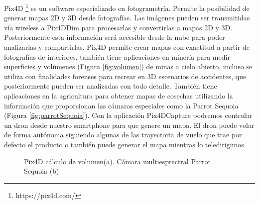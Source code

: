 \begin {enumerate}
Pix4D \footnote{https://pix4d.com/} es un software especializado en fotogrametría. Permite la posibilidad de generar mapas 2D y 3D desde fotografías. Las imágenes pueden ser transmitidas vía wireless a Pix4DDim para procesarlas y convertirlas a mapas 2D y 3D.  Posteriormente esta información será accesible desde la nube para poder analizarlas y compartirlas.
Pix4D permite crear mapas con exactitud a partir de fotografías de interiores, también tiene aplicaciones en minería para medir superficies y volúmenes (Figura \ref{fig:volumen}) de minas a cielo abierto, incluso se utiliza con finalidades forenses para recrear en 3D escenarios de accidentes, que posteriormente pueden ser analizadas con todo detalle.
También tiene aplicaciones en la agricultura para obtener mapas de cosechas utilizando la información que proporcionan las cámaras especiales como la Parrot Sequoia (Figura \ref{fig:parrotSequoia}).
Con la aplicación Pix4DCapture podremos controlar un dron desde nuestro smartphone para que genere un mapa. El dron puede volar de forma autónoma siguiendo algunas de las trayectoria de vuelo que trae por defecto el producto o también puede generar el mapa mientras lo teledirigimos.

\begin{figure}[H]
\begin{center}
\hspace{0.5cm}
\end{center}
\caption{Pix4D cálculo de volumen(a). Cámara multiesprectral Parrot Sequoia (b)}
\end{figure}


\end{enumerate}
